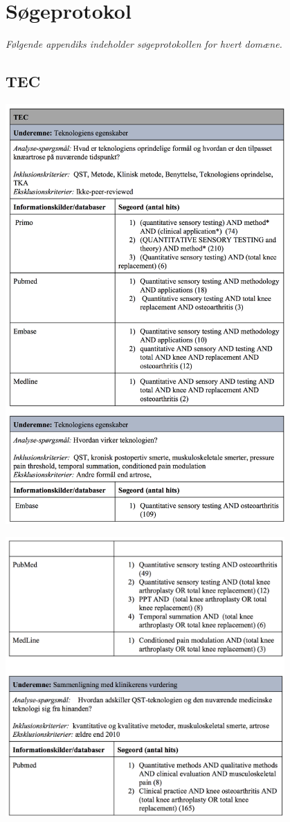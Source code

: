 \chapter{Søgeprotokol} \vspace{-.75cm}
\textit{Følgende appendiks indeholder søgeprotokollen for hvert domæne.}
\section{TEC}\label{TEC_sog}
\begin{center}
\includegraphics[width=0.8\textwidth]{rapportAfsnit/qBilag/sogninger/TEC1}

\includegraphics[width=0.8\textwidth]{rapportAfsnit/qBilag/sogninger/TEC2}
\end{center}

